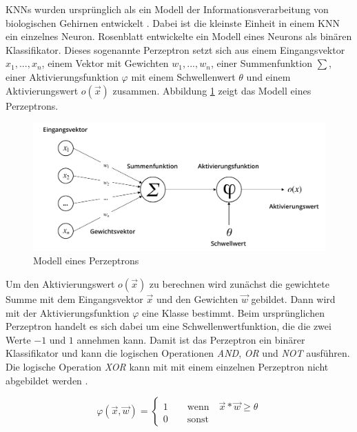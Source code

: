 \acp{KNN} wurden ursprünglich als ein Modell der Informationsverarbeitung von biologischen Gehirnen entwickelt \cite{mcculloch1943logical}. Dabei ist die kleinste Einheit in einem \ac{KNN} ein einzelnes Neuron. Rosenblatt \cite{rosenblatt1958perceptron} entwickelte ein Modell eines Neurons als binären Klassifikator. Dieses sogenannte Perzeptron setzt sich aus einem Eingangsvektor $x_1, ..., x_n$, einem Vektor mit Gewichten $w_1, ..., w_n$, einer Summenfunktion $\sum$, einer Aktivierungsfunktion $\varphi$ mit einem Schwellenwert $\theta$ und einem Aktivierungswert $o(\vec{x})$ zusammen. Abbildung \ref{fig_perceptron} zeigt das Modell eines Perzeptrons.

\begin{figure}[h]
\centering
\includegraphics[scale=0.7]{images/perceptron.pdf}
\caption[Modell eines Perzeptrons]{Modell eines Perzeptrons \cite{rosenblatt1958perceptron}}
\label{fig_perceptron}
\end{figure}

Um den Aktivierungswert $o(\vec{x})$ zu berechnen wird zunächst die gewichtete Summe mit dem Eingangsvektor $\vec{x}$ und den Gewichten $\vec{w}$ gebildet. Dann wird mit der Aktivierungsfunktion $\varphi$ eine Klasse bestimmt. Beim ursprünglichen Perzeptron handelt es sich dabei um eine Schwellenwertfunktion, die die zwei Werte $-1$ und $1$ annehmen kann. Damit ist das Perzeptron ein binärer Klassifikator und kann die logischen Operationen \textit{AND}, \textit{OR} und \textit{NOT} ausführen. Die logische Operation \textit{XOR} kann mit mit einem einzelnen Perzeptron nicht abgebildet werden \cite{minski1969perceptrons}.

\begin{equation}
\varphi(\vec{x}, \vec{w}) = \begin{cases} 1 \qquad \text{wenn} \quad \vec{x}*\vec{w} \geq \theta \\ 0 \qquad \text{sonst} \end{cases}
\end{equation}

